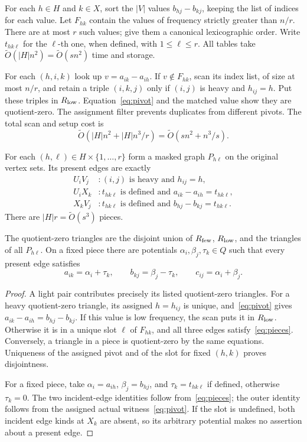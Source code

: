 \documentclass[manuscript,screen,nonacm,11pt]{acmart}
\newcommand{\Ot}{\widetilde O}
\begin{document}
For each $h\in H$ and $k\in X$, sort the $|V|$ values $b_{hj}-b_{kj}$,
keeping the list of indices for each value. Let $F_{hk}$ contain the values
of frequency strictly greater than $n/r$. There are at most $r$ such values;
give them a canonical lexicographic order. Write $t_{hk\ell}$ for the
$\ell$-th one, when defined, with $1\le\ell\le r$. All tables take
$\Ot(|H|n^2)=\Ot(sn^2)$ time and storage.

For each $(h,i,k)$ look up $v=a_{ik}-a_{ih}$. If $v\notin F_{hk}$,
scan its index list, of size at most $n/r$, and retain a triple $(i,k,j)$
only if $(i,j)$ is heavy and $h_{ij}=h$. Put these triples in $R_{\rm low}$.
Equation~\eqref{eq:pivot} and the matched value show they are quotient-zero.
The assignment filter prevents duplicates from different pivots. The total
scan and setup cost is
\begin{equation}\label{eq:lowcost}
 \Ot(|H|n^2+|H|n^3/r)=\Ot(sn^2+n^3/s).
\end{equation}

For each $(h,\ell)\in H\times\{1,\ldots,r\}$ form a masked graph $P_{h\ell}$
on the original vertex sets. Its present edges are exactly
\begin{align}
 U_iV_j &: (i,j)\text{ is heavy and }h_{ij}=h,\nonumber\\
 U_iX_k &: t_{hk\ell}\text{ is defined and }a_{ik}-a_{ih}=t_{hk\ell},\label{eq:pieces}\\
 X_kV_j &: t_{hk\ell}\text{ is defined and }b_{hj}-b_{kj}=t_{hk\ell}.\nonumber
\end{align}
There are $|H|r=\Ot(s^3)$ pieces.

\begin{lemma}\label{lem:partition}
The quotient-zero triangles are the disjoint union of $R_{\rm few}$,
$R_{\rm low}$, and the triangles of all $P_{h\ell}$.
On a fixed piece there are potentials $\alpha_i,\beta_j,\tau_k\in Q$
such that every present edge satisfies
\begin{equation}\label{eq:potentials}
 a_{ik}=\alpha_i+\tau_k,\qquad
 b_{kj}=\beta_j-\tau_k,\qquad
 c_{ij}=\alpha_i+\beta_j.
\end{equation}
\end{lemma}
\begin{proof}
A light pair contributes precisely its listed quotient-zero triangles.
For a heavy quotient-zero triangle, its assigned $h=h_{ij}$ is unique,
and~\eqref{eq:pivot} gives
$a_{ik}-a_{ih}=b_{hj}-b_{kj}$. If this value is low frequency, the scan
puts it in $R_{\rm low}$. Otherwise it is in a unique slot $\ell$ of
$F_{hk}$, and all three edges satisfy~\eqref{eq:pieces}. Conversely, a
triangle in a piece is quotient-zero by the same equations. Uniqueness of
the assigned pivot and of the slot for fixed $(h,k)$ proves disjointness.

For a fixed piece, take $\alpha_i=a_{ih}$, $\beta_j=b_{hj}$, and
$\tau_k=t_{hk\ell}$ if defined, otherwise $\tau_k=0$.
The two incident-edge identities follow from~\eqref{eq:pieces}; the outer
identity follows from the assigned actual witness~\eqref{eq:pivot}.
If the slot is undefined, both incident edge kinds at $X_k$ are absent,
so its arbitrary potential makes no assertion about a present edge.
\end{proof}
\end{document}
